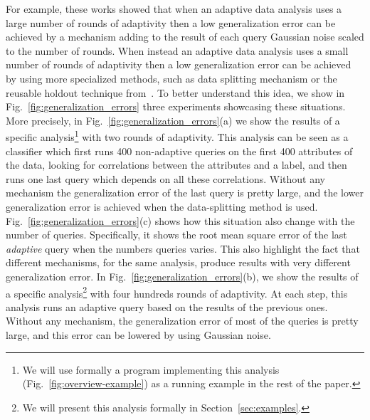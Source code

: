 For example, these works showed that when an adaptive data analysis uses a large number of rounds of adaptivity then a low generalization error can be achieved by a mechanism  
adding to the result of each query Gaussian noise scaled to the number of rounds. When instead  an adaptive data analysis uses a small number of rounds of adaptivity then a low generalization error can be achieved by using more specialized methods, such as data splitting mechanism or the reusable holdout technique from~\cite{DworkFHPRR15}.
To better understand this idea, we show in Fig.~\ref{fig:generalization_errors} three experiments showcasing these situations.
More precisely, in Fig.~\ref{fig:generalization_errors}(a) we show the results of a specific analysis\footnote{We will use formally a program implementing this analysis (Fig.~\ref{fig:overview-example}) as a running example in the rest of the paper.} with two rounds of adaptivity.
This analysis can be seen as a classifier which first runs 400 non-adaptive queries on the first 400 attributes of the data, looking for correlations between the attributes and a label, and then runs one last query which depends on all these correlations.
Without any mechanism the generalization error of the last query is pretty large, and the lower generalization error is achieved when the data-splitting method is used.
Fig.~\ref{fig:generalization_errors}(c) shows how this situation also change with the number of queries. Specifically, it shows the root mean square error of the last \emph{adaptive} query when the numbers queries varies. This also highlight the fact that different mechanisms, for the same analysis, produce results with very different generalization error.
In Fig.~\ref{fig:generalization_errors}(b), we show the results of a specific analysis\footnote{We will present this analysis formally in Section~\ref{sec:examples}.} with four hundreds rounds of adaptivity.
At each step, this analysis runs an adaptive query based on the results of the previous ones. Without any mechanism, the generalization error of most of the queries is pretty large, and this error can be lowered by using Gaussian noise. 
